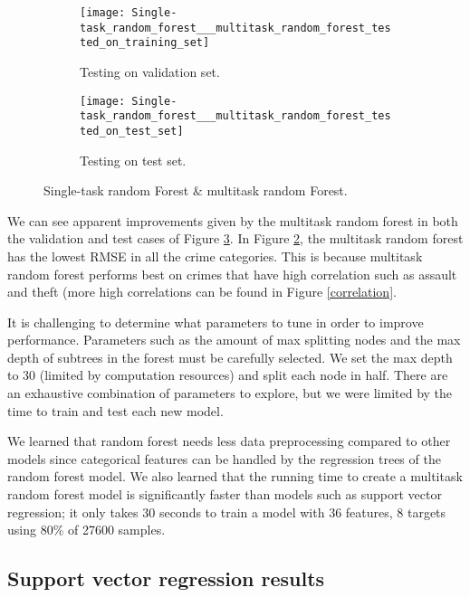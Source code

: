 \documentclass{article}
\begin{document}
\begin{figure}[h]
    \begin{subfigure}[b]{0.5\textwidth}
        \texttt{[image: Single-task\_random\_forest\_\_\_multitask\_random\_forest\_tested\_on\_training\_set]}
        \caption{Testing on validation set. \label{fig:rftraining}}
    \end{subfigure}
    \begin{subfigure}[b]{0.5\textwidth}
        \texttt{[image: Single-task\_random\_forest\_\_\_multitask\_random\_forest\_tested\_on\_test\_set]}
        \caption{Testing on test set. \label{fig:rftest}}
    \end{subfigure}
      \caption[Caption for LOF]{Single-task random Forest \& multitask random Forest.\footnotemark}
 \label{rf_base}
\end{figure}

We can see apparent improvements given by the multitask random forest in both the validation and test cases of Figure \ref{rf_base}. In Figure \ref{fig:rftest}, the multitask random forest has the lowest RMSE in all the crime categories. This is because multitask random forest performs best on  crimes that have high correlation such as assault and theft (more high correlations can be found in Figure \ref{correlation}.

It is challenging to determine what parameters to tune in order to improve performance. Parameters such as the amount of max splitting nodes and the max depth of subtrees in the forest must be carefully selected. We set the max depth to 30 (limited by computation resources) and split each node in half. There are an exhaustive combination of parameters to explore, but we were limited by the time to train and test each new model.

We learned that random forest needs less data preprocessing compared to other models since categorical features can be handled by the regression trees of the random forest model. We also learned that the running time to create a multitask random forest model is significantly faster than models such as support vector regression; it only takes 30 seconds to train a model with 36 features, 8 targets using 80\% of 27600 samples.


\subsection{Support vector regression results}
\end{document}
